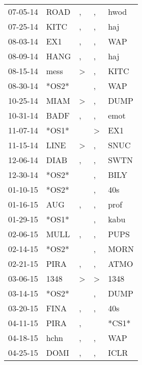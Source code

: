 \begin{supertabular}{lllll}
 07-05-14 &   ROAD &                , &             , &   hwod \\
 07-25-14 &   KITC &                , &             , &    haj \\
 08-03-14 &    EX1 &                , &             , &    WAP \\
 08-09-14 &   HANG &                , &             , &    haj \\
 08-15-14 &   mess &     \textgreater &             , &   KITC \\
 08-30-14 &  *OS2* &                  &             , &    WAP \\
 10-25-14 &   MIAM &     \textgreater &             , &   DUMP \\
 10-31-14 &   BADF &                , &             , &   emot \\
 11-07-14 &  *OS1* &                  &  \textgreater &    EX1 \\
 11-15-14 &   LINE &     \textgreater &             , &   SNUC \\
 12-06-14 &   DIAB &                , &             , &   SWTN \\
 12-30-14 &  *OS2* &                  &             , &   BILY \\
 01-10-15 &  *OS2* &                  &             , &    40s \\
 01-16-15 &    AUG &                , &             , &   prof \\
 01-29-15 &  *OS1* &                  &             , &   kabu \\
 02-06-15 &   MULL &                , &             , &   PUPS \\
 02-14-15 &  *OS2* &                  &             , &   MORN \\
 02-21-15 &   PIRA &                , &             , &   ATMO \\
 03-06-15 &   1348 &     \textgreater &  \textgreater &   1348 \\
 03-14-15 &  *OS2* &                  &             , &   DUMP \\
 03-20-15 &   FINA &                , &             , &    40s \\
 04-11-15 &   PIRA &                , &               &  *CS1* \\
 04-18-15 &   hchn &                , &             , &    WAP \\
 04-25-15 &   DOMI &                , &             , &   ICLR \\

\end{supertabular}
